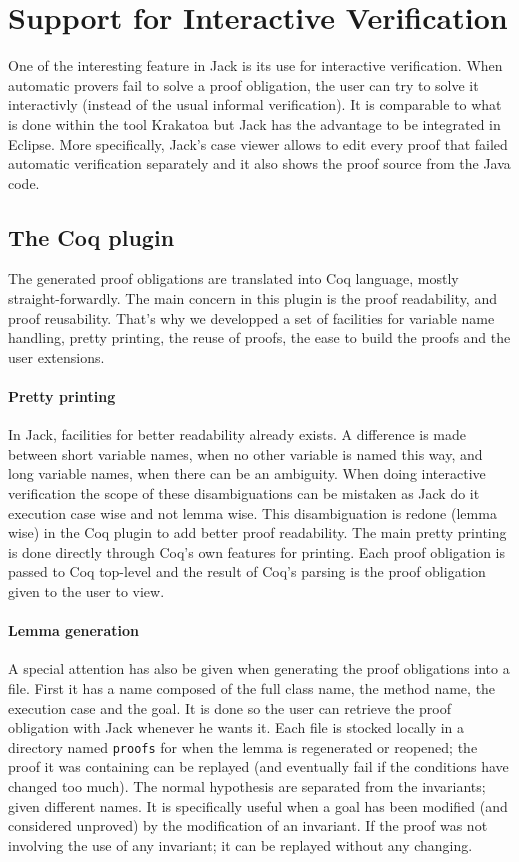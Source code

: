 


\section{Support for Interactive Verification}\label{SecInteractive}
One of the interesting feature in Jack is its use for interactive 
verification. When automatic provers fail to solve a proof obligation,
the user can try to solve it interactivly (instead of the usual 
informal verification). It is comparable to what is done within the tool
 Krakatoa but Jack has the advantage to be integrated in Eclipse.
More specifically, Jack's case viewer allows to edit every proof that 
failed automatic verification separately and 
it also shows the proof source from the Java code. 
\subsection{The Coq plugin}
The generated  proof obligations are translated into Coq language, mostly
straight-forwardly. The main concern in this plugin is the proof readability,
and proof reusability.
That's why we developped a set of facilities for variable name handling,
pretty printing, the reuse of proofs, the ease to build the proofs and the 
user extensions.

\paragraph{Pretty printing}
In Jack, facilities for better readability already exists.
A difference is made between short variable names, 
when no other variable is named this way,
 and long variable names, when there can be an ambiguity. 
When doing interactive verification the scope of these disambiguations 
can be mistaken as Jack do it execution case wise and not lemma wise.
This disambiguation is redone (lemma wise) 
in the Coq plugin to add better proof readability.
The main pretty printing is done directly through Coq's own features for
 printing. Each proof obligation is passed to Coq top-level and the result of 
Coq's parsing is the proof obligation given to the user to view.

\paragraph{Lemma generation} 
A special attention has also be given when generating the proof obligations 
into a file. First it has a name composed of the full class name, the method
name, the execution case and the goal. It is done so the user can retrieve 
the proof obligation with Jack whenever he wants it. Each file is stocked
locally in a directory named {\tt proofs} 
for when the lemma is regenerated or reopened; the proof it was containing
can be replayed (and eventually fail if the conditions have changed too much).
The normal hypothesis are separated from the invariants; given different names.
It is specifically useful when a goal has been modified (and considered 
unproved) by the modification of an invariant. If the proof was not involving
the use of any invariant; it can be replayed without any changing.

